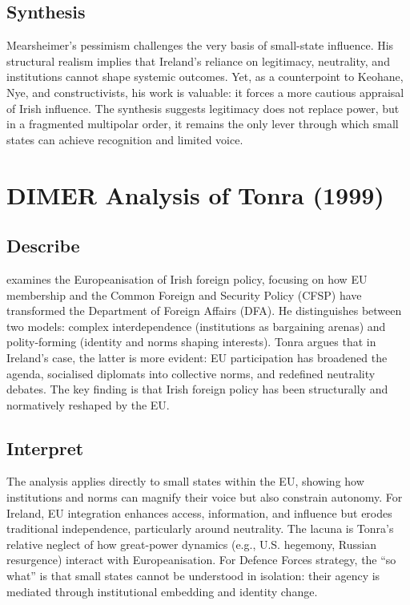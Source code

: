 \subsection*{Synthesis}
Mearsheimer’s pessimism challenges the very basis of small-state influence. His structural realism implies that Ireland’s reliance on legitimacy, neutrality, and institutions cannot shape systemic outcomes. Yet, as a counterpoint to Keohane, Nye, and constructivists, his work is valuable: it forces a more cautious appraisal of Irish influence. The synthesis suggests legitimacy does not replace power, but in a fragmented multipolar order, it remains the only lever through which small states can achieve recognition and limited voice.

\section*{DIMER Analysis of Tonra (1999)}

\subsection*{Describe}
\textcite{TONRA_1999} examines the Europeanisation of Irish foreign policy, focusing on how EU membership and the Common Foreign and Security Policy (CFSP) have transformed the Department of Foreign Affairs (DFA). He distinguishes between two models: complex interdependence (institutions as bargaining arenas) and polity-forming (identity and norms shaping interests). Tonra argues that in Ireland’s case, the latter is more evident: EU participation has broadened the agenda, socialised diplomats into collective norms, and redefined neutrality debates. The key finding is that Irish foreign policy has been structurally and normatively reshaped by the EU.

\subsection*{Interpret}
The analysis applies directly to small states within the EU, showing how institutions and norms can magnify their voice but also constrain autonomy. For Ireland, EU integration enhances access, information, and influence but erodes traditional independence, particularly around neutrality. The lacuna is Tonra’s relative neglect of how great-power dynamics (e.g., U.S. hegemony, Russian resurgence) interact with Europeanisation. For Defence Forces strategy, the “so what” is that small states cannot be understood in isolation: their agency is mediated through institutional embedding and identity change.


